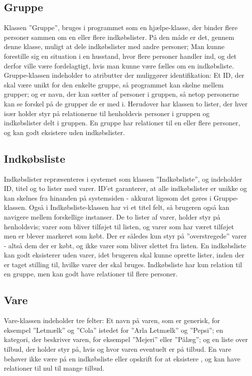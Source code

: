 \subsection{Gruppe}
Klassen ''Gruppe'', bruges i programmet som en hjælpe-klasse, der binder flere personer sammen om en eller flere indkøbslister. 
På den måde er det, gennem denne klasse, muligt at dele indkøbslister med andre personer; 
Man kunne forestille sig en situation i en husstand, hvor flere personer handler ind, og det derfor ville være fordelagtigt, hvis man kunne være fælles om en indkøbsliste.
Gruppe-klassen indeholder to atributter der muliggører identifikation: Et ID, der skal være unikt for den enkelte gruppe, så programmet kan skelne mellem grupper; og er navn, der kan sætter af personer i gruppen, så netop personerne kan se forskel på de grupper de er med i. 
Herudover har klassen to lister, der hver især holder styr på relationerne til henholdsvis personer i gruppen og indkøbslister delt i gruppen.
En gruppe har relationer til en eller flere personer, og kan godt eksistere uden indkøbslister.

\subsection{Indkøbsliste}
Indkøbslister repræsenteres i systemet som klassen ''Indkøbsliste'', og indeholder ID, titel og to lister med varer. 
ID'et garanterer, at alle indkøbslister er unikke og kan skelnes fra hinanden på systemsiden - akkurat ligesom det gøres i Gruppe-klassen. 
Også i Indkøbsliste-klassen har vi et titel felt, så brugeren også kan navigere mellem forskellige instanser.
De to lister af varer, holder styr på henholdsvis; varer som bliver tilføjet til listen, og varer som har været tilføjet men er blever markeret som købt. 
Der er således kun styr på ''overstregede'' varer - altså dem der er købt, og ikke varer som bliver slettet fra listen.
En indkøbsliste kan godt eksisterer uden varer, idet brugeren skal kunne oprette lister, inden der er taget stilling til, hvilke varer der skal bruges.
Indkøbsliste har kun relation til en gruppe, men kan godt have relationer til flere personer.

\subsection{Vare}
Vare-klassen indeholder tre felter: Et navn på varen, som er generisk, for eksempel ''Letmælk'' og ''Cola'' istedet for ''Arla Letmælk'' og ''Pepsi''; en kategori, der beskriver varen, for eksempel ''Mejeri'' eller ''Pålæg''; og en liste over tilbud, der holder styr på, hvis og hvor varen eventuelt er på tilbud.
En vare behøver ikke være på en indkøbsliste eller opskrift for at eksistere , og kan have relationer til nul til mange tilbud.

